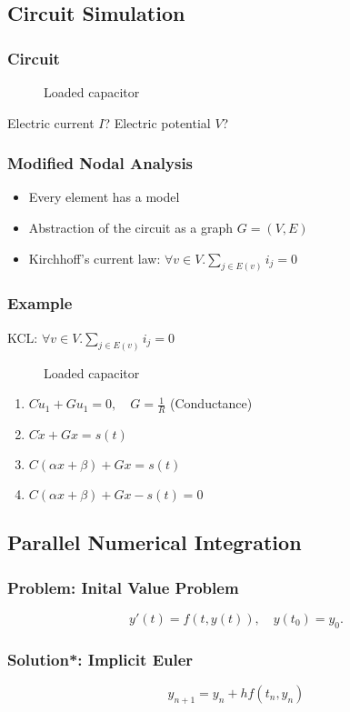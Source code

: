\subsection{Circuit Simulation}
\begin{frame}
\frametitle{Circuit}
\begin{figure}[ht]
    \centering\scalebox{1.5}{
        \begin{circuitikz}[scale=1.5]
            
        \end{circuitikz}}
    \caption{Loaded capacitor}
\label{fig:cap}
\end{figure}
Electric current \(I\)?
Electric potential \(V\)?
\end{frame}

\begin{frame}
\frametitle{Modified Nodal Analysis}
\begin{itemize}[<+->]
    \item Every element has a model
    \item Abstraction of the circuit as a graph \(G = (V,E)\)
    \item Kirchhoff's current law: \(\forall v \in V. \sum_{j \in E(v)} i_{j} = 0\)
\end{itemize}
\end{frame}

\begin{frame}
\frametitle{Example}
KCL: \(\forall v \in V. \sum_{j \in E(v)} i_{j} = 0\)
\begin{figure}[ht]
    \centering
        \begin{circuitikz}
            
        \end{circuitikz}
    \caption{Loaded capacitor}
\label{fig:cap}
\end{figure}
\pause
\begin{enumerate}[<+->]
    \item \(C\dot{u}_1 + Gu_1 = 0,\quad G=\frac{1}{R}\) (Conductance)
    \item \(C \dot{x} + G x = s(t)\)
    \item \(C (\alpha x + \beta) + G x = s(t)\)
    \item \(C (\alpha x + \beta) + G x - s(t)= 0\)
\end{enumerate}
\end{frame}


\subsection{Parallel Numerical Integration}
\begin{frame}
\frametitle{Problem: Inital Value Problem}
\begin{equation*}
y'(t) = f(t,y(t)), \quad y(t_0) = y_0.
\end{equation*}
\end{frame}

\begin{frame}
\frametitle{Solution*: Implicit Euler}
\begin{equation*}
y_{n+1} = y_n + hf(t_n,y_n)
\end{equation*}
\end{frame}

